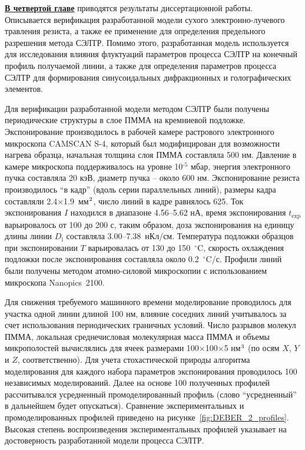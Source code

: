 \underline{\textbf{В четвертой главе}} приводятся результаты  диссертационной работы.
Описывается верификация разработанной модели сухого электронно-лучевого травления резиста, а также ее применение для определения предельного разрешения метода СЭЛТР.
Помимо этого, разработанная модель используется для исследования влияния флуктуаций параметров процесса СЭЛТР на конечный профиль получаемой линии, а также для определения параметров процесса СЭЛТР для формирования синусоидальных дифракционных и голографических элементов.

Для верификации разработанной модели методом СЭЛТР были получены периодические структуры в слое ПММА на кремниевой подложке.
Экспонирование производилось в рабочей камере растрового электронного микроскопа CAMSCAN S-4, который был модифицирован для возможности нагрева образца, начальная толщина слоя ПММА составляла 500 нм.
Давление в камере микроскопа поддерживалось на уровне 10$^\text{-5}$ мбар, энергия электронного пучка составляла 20 кэВ, диаметр пучка -- \linebreak около 600 нм.
Экспонирование резиста производилось ``в кадр'' (вдоль серии параллельных линий), размеры кадра составляли 2.4$\times$1.9~мм$^\text{2}$, число линий в кадре равнялось 625.
Ток экспонирования $I$ находился в диапазоне 4.56--5.62 нА, время экспонирования $t_\mathrm{exp}$ варьировалось от 100 до 200 с, таким образом, доза экспонирования на единицу длины линии $D_\mathrm{l}$ составляла 3.00--7.38~нКл/см.
Температура подложки образцов при экспонировании $T$ варьировалась от 130 до 150~$^\circ$C, скорость охлаждения подложки после экспонирования составляла около 0.2~$^\circ$C/с.
Профили линий были получены методом атомно-силовой микроскопии с использованием микроскопа Nanopics~2100.

Для снижения требуемого машинного времени моделирование проводилось для участка одной линии длиной 100 нм, влияние соседних линий учитывалось за счет использования периодических граничных условий.
Число разрывов молекул ПММА, локальная среднечисловая молекулярная масса ПММА и объемы микрополостей вычислялись для ячеек размерами 100$\times$100$\times$5 нм$^\text{3}$ (по осям $X$, $Y$ и $Z$, соответственно).
Для учета стохастической природы алгоритма моделирования для каждого набора параметров экспонирования проводилось 100 независимых моделирований.
Далее на основе 100 полученных профилей рассчитывался усредненный промоделированный профиль (слово ``усредненный'' в дальнейшем будет опускаться).
Сравнение экспериментальных и промоделированных профилей приведено на рисунке~\ref{fig:DEBER_2_profiles}.
Высокая степень воспроизведения экспериментальных профилей указывает на достоверность разработанной модели процесса СЭЛТР.

